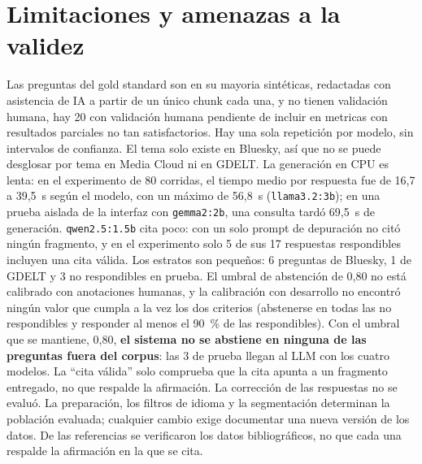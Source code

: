 \documentclass[conference]{IEEEtran}
\begin{document}
\section{Limitaciones y amenazas a la validez}
Las preguntas del gold standard son en su mayoria sintéticas, redactadas con asistencia de IA a partir de un único chunk cada una, y no tienen validación humana, hay 20 con validación humana pendiente de incluir en metricas con resultados parciales no tan satisfactorios. Hay una sola repetición por modelo, sin intervalos de confianza. El tema solo existe en Bluesky, así que no se puede desglosar por tema en Media Cloud ni en GDELT. La generación en CPU es lenta: en el experimento de 80 corridas, el tiempo medio por respuesta fue de 16,7 a 39,5~s según el modelo, con un máximo de 56,8~s (\texttt{llama3.2:3b}); en una prueba aislada de la interfaz con \texttt{gemma2:2b}, una consulta tardó 69,5~s de generación. \texttt{qwen2.5:1.5b} cita poco: con un solo prompt de depuración no citó ningún fragmento, y en el experimento solo 5 de sus 17 respuestas respondibles incluyen una cita válida. Los estratos son pequeños: 6 preguntas de Bluesky, 1 de GDELT y 3 no respondibles en prueba. El umbral de abstención de 0,80 no está calibrado con anotaciones humanas, y la calibración con desarrollo no encontró ningún valor que cumpla a la vez los dos criterios (abstenerse en todas las no respondibles y responder al menos el 90~\% de las respondibles). Con el umbral que se mantiene, 0,80, \textbf{el sistema no se abstiene en ninguna de las preguntas fuera del corpus}: las 3 de prueba llegan al LLM con los cuatro modelos. La ``cita válida'' solo comprueba que la cita apunta a un fragmento entregado, no que respalde la afirmación. La corrección de las respuestas no se evaluó. La preparación, los filtros de idioma y la segmentación determinan la población evaluada; cualquier cambio exige documentar una nueva versión de los datos. De las referencias se verificaron los datos bibliográficos, no que cada una respalde la afirmación en la que se cita.
\end{document}
